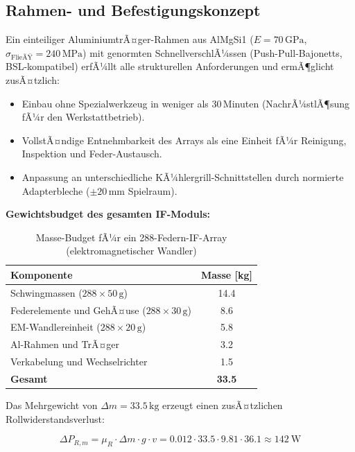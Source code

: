 ﻿\documentclass[12pt, a4paper]{report}
\theoremstyle{definition}
\theoremstyle{remark}
\begin{document}
\subsection{Rahmen- und Befestigungskonzept}

Ein einteiliger AluminiumtrÃ¤ger-Rahmen aus AlMgSi1 ($E = 70\,\text{GPa}$,
$\sigma_{\text{FlieÃŸ}} = 240\,\text{MPa}$) mit genormten Schnell\-verschlÃ¼ssen
(Push-Pull-Bajonetts, BSL-kompatibel) erfÃ¼llt alle strukturellen Anforderungen
und ermÃ¶glicht zusÃ¤tzlich:

\begin{itemize}
  \item Einbau ohne Spezialwerkzeug in weniger als 30\,Minuten (NachrÃ¼stlÃ¶sung
        fÃ¼r den Werkstattbetrieb).
  \item VollstÃ¤ndige Entnehmbarkeit des Arrays als eine Einheit fÃ¼r
        Reinigung, Inspektion und Feder-Austausch.
  \item Anpassung an unterschiedliche KÃ¼hlergrill-Schnittstellen durch
        normierte Adapterbleche ($\pm 20\,\text{mm}$ Spielraum).
\end{itemize}

\textbf{Gewichtsbudget des gesamten IF-Moduls:}

\begin{table}[H]
  \centering
  \caption{Masse-Budget fÃ¼r ein 288-Federn-IF-Array (elektromagnetischer Wandler)}
  \label{tab:gewicht}
  \begin{tabular}{lS}
    \toprule
    Komponente & {Masse [kg]} \\
    \midrule
    Schwingmassen ($288 \times 50\,\text{g}$)           & 14.4 \\
    Federelemente und GehÃ¤use ($288 \times 30\,\text{g}$) & 8.6 \\
    EM-Wandlereinheit ($288 \times 20\,\text{g}$)        & 5.8 \\
    Al-Rahmen und TrÃ¤ger                                 & 3.2 \\
    Verkabelung und Wechselrichter                       & 1.5 \\
    \midrule
    \textbf{Gesamt}                                      & \textbf{33.5} \\
    \bottomrule
  \end{tabular}
\end{table}

Das Mehrgewicht von $\Delta m = 33.5\,\text{kg}$ erzeugt einen zusÃ¤tzlichen
Rollwiderstandsverlust:

\begin{equation}
  \Delta P_{R,m} = \mu_R \cdot \Delta m \cdot g \cdot v
  = 0.012 \cdot 33.5 \cdot 9.81 \cdot 36.1 \approx \SI{142}{\watt}
  \label{eq:delta_pr_gewicht}
\end{equation}
\end{document}
